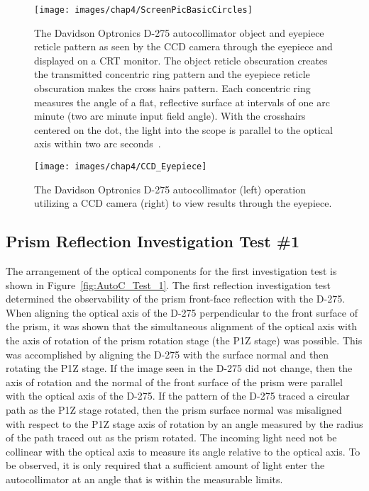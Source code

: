 \begin{figure}[H]  %
\centering
\texttt{[image: images/chap4/ScreenPicBasicCircles]}
\caption{The Davidson Optronics D-275 autocollimator object and eyepiece reticle pattern as seen by the CCD camera through the eyepiece and displayed on a CRT monitor. The object reticle obscuration creates the transmitted concentric ring pattern and the eyepiece reticle obscuration makes the cross hairs pattern. Each concentric ring measures the angle of a flat, reflective surface at intervals of one arc minute (two arc minute input field angle). With the crosshairs centered on the dot, the light into the scope is parallel to the optical axis within two arc seconds~\cite{D275}.}
\label{fig:reticlePattern}
\end{figure}

\begin{figure}[H]  %
\centering
\texttt{[image: images/chap4/CCD\_Eyepiece]}
\caption{The Davidson Optronics D-275 autocollimator (left) operation utilizing a CCD camera (right) to view results through the eyepiece.}
\label{fig:CCD_Eyepiece}
\end{figure}

\subsection{Prism Reflection Investigation Test \#1}
\label{sec:prismTest_1}
 The arrangement of the optical components for the first investigation test is shown in Figure~\ref{fig:AutoC_Test_1}. The first reflection investigation test determined the observability of the prism front-face reflection with the D-275. When aligning the optical axis of the D-275 perpendicular to the front surface of the prism, it was shown that the simultaneous alignment of the optical axis with the axis of rotation of the prism rotation stage (the P1Z stage) was possible. This was accomplished by aligning the D-275 with the surface normal and then rotating the P1Z stage. If the image seen in the D-275 did not change, then the axis of rotation and the normal of the front surface of the prism were parallel with the optical axis of the D-275. If the pattern of the D-275 traced a circular path as the P1Z stage rotated, then the prism surface normal was misaligned with respect to the P1Z stage axis of rotation by an angle measured by the radius of the path traced out as the prism rotated. The incoming light need not be collinear with the optical axis to measure its angle relative to the optical axis. To be observed, it is only required that a sufficient amount of light enter the autocollimator at an angle that is within the measurable limits.

